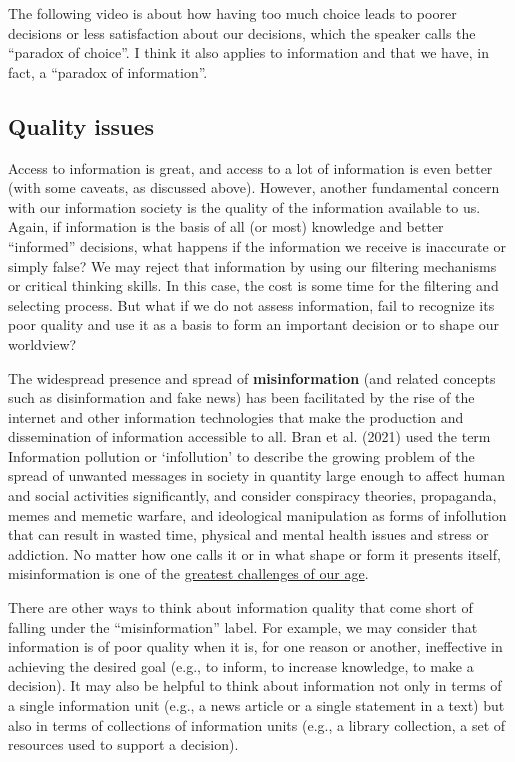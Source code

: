 \documentclass[
  letterpaper,
  DIV=11,
  numbers=noendperiod]{scrreprt}
\begin{document}
The following video is about how having too much choice leads to poorer
decisions or less satisfaction about our decisions, which the speaker
calls the ``paradox of choice''. I think it also applies to information
and that we have, in fact, a ``paradox of information''.

\subsection{Quality issues}\label{quality-issues}

Access to information is great, and access to a lot of information is
even better (with some caveats, as discussed above). However, another
fundamental concern with our information society is the quality of the
information available to us. Again, if information is the basis of all
(or most) knowledge and better ``informed'' decisions, what happens if
the information we receive is inaccurate or simply false? We may reject
that information by using our filtering mechanisms or critical thinking
skills. In this case, the cost is some time for the filtering and
selecting process. But what if we do not assess information, fail to
recognize its poor quality and use it as a basis to form an important
decision or to shape our worldview?

The widespread presence and spread of \textbf{misinformation} (and
related concepts such as disinformation and fake news) has been
facilitated by the rise of the internet and other information
technologies that make the production and dissemination of information
accessible to all. Bran et al. (2021) used the term Information
pollution or `infollution' to describe the growing problem of the spread
of unwanted messages in society in quantity large enough to affect human
and social activities significantly, and consider conspiracy theories,
propaganda, memes and memetic warfare, and ideological manipulation as
forms of infollution that can result in wasted time, physical and mental
health issues and stress or addiction. No matter how one calls it or in
what shape or form it presents itself, misinformation is one of the
\href{https://www.bbc.com/future/article/20170301-lies-propaganda-and-fake-news-a-grand-challenge-of-our-age}{greatest
challenges of our age}.

There are other ways to think about information quality that come short
of falling under the ``misinformation'' label. For example, we may
consider that information is of poor quality when it is, for one reason
or another, ineffective in achieving the desired goal (e.g., to inform,
to increase knowledge, to make a decision). It may also be helpful to
think about information not only in terms of a single information unit
(e.g., a news article or a single statement in a text) but also in terms
of collections of information units (e.g., a library collection, a set
of resources used to support a decision).
\end{document}
